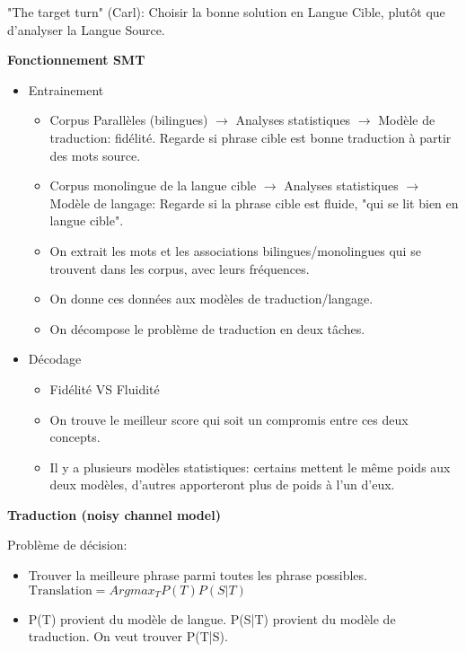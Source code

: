 "The target turn" (Carl): Choisir la bonne solution en Langue Cible, plutôt que d'analyser la Langue Source.\\

\newpage

\textbf{Fonctionnement SMT}

\begin{itemize}
    \item Entrainement
        \begin{itemize}
            \item Corpus Parallèles (bilingues) $\rightarrow$ Analyses statistiques $\rightarrow$ Modèle de traduction: fidélité. Regarde si phrase cible est bonne traduction à partir des mots source.
            \item Corpus monolingue de la langue cible $\rightarrow$ Analyses statistiques $\rightarrow$ Modèle de langage: Regarde si la phrase cible est fluide, "qui se lit bien en langue cible".
            \item On extrait les mots et les associations bilingues/monolingues qui se trouvent dans les corpus, avec leurs fréquences.
            \item On donne ces données aux modèles de traduction/langage.
            \item On décompose le problème de traduction en deux tâches.
        \end{itemize}
    \item Décodage
        \begin{itemize}
            \item Fidélité VS Fluidité
            \item On trouve le meilleur score qui soit un compromis entre ces deux concepts.
            \item Il y a plusieurs modèles statistiques: certains mettent le même poids aux deux modèles, d'autres apporteront plus de poids à l'un d'eux.\\
        \end{itemize}
\end{itemize}

\textbf{Traduction (noisy channel model)}

Problème de décision:

\begin{itemize}
    \item Trouver la meilleure phrase parmi toutes les phrase possibles. $\text{Translation} = Argmax_T P(T) P(S|T)$
    \item P(T) provient du modèle de langue. P(S|T) provient du modèle de traduction. On veut trouver P(T|S). \\
\end{itemize}


